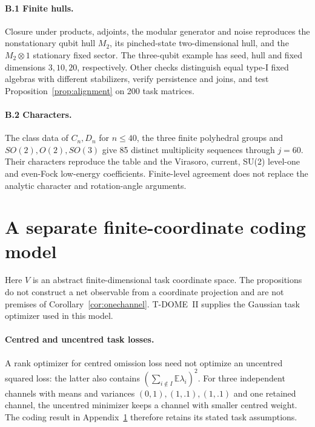 \documentclass[12pt]{article}
\theoremstyle{definition}
\theoremstyle{remark}
\begin{document}
\paragraph{B.1 Finite hulls.}
Closure under products, adjoints, the modular generator and noise
reproduces the nonstationary qubit hull $M_2$, its pinched-state
two-dimensional hull, and the $M_2\otimes1$ stationary fixed sector.
The three-qubit example has seed, hull and fixed dimensions
$3,10,20$, respectively. Other checks distinguish equal type-I fixed
algebras with different stabilizers, verify persistence and joins,
and test Proposition~\ref{prop:alignment} on 200 task matrices.

\paragraph{B.2 Characters.}
The class data of $C_n,D_n$ for $n\le40$, the three finite polyhedral
groups and $SO(2),O(2),SO(3)$ give 85 distinct multiplicity sequences
through $j=60$. Their characters reproduce the table and the
Virasoro, current, SU(2) level-one and even-Fock low-energy coefficients.
Finite-level agreement does not replace the analytic character
and rotation-angle arguments.

\section{A separate finite-coordinate coding model}\label{app:budget}

Here $V$ is an abstract finite-dimensional task coordinate space.
The propositions do not construct a net observable from a coordinate
projection and are not premises of Corollary~\ref{cor:onechannel}.
T-DOME~II supplies the Gaussian task optimizer used in this model.

\paragraph{Centred and uncentred task losses.}
A rank optimizer for centred omission loss need not optimize an
uncentred squared loss: the latter also contains
$(\sum_{i\notin I}\mathbb E\lambda_i)^2$.
For three independent channels with means and variances
$(0,1),(1,.1),(1,.1)$ and one retained channel, the uncentred minimizer
keeps a channel with smaller centred weight. The coding result in
Appendix~\ref{app:budget} therefore retains its stated task assumptions.
\end{document}
